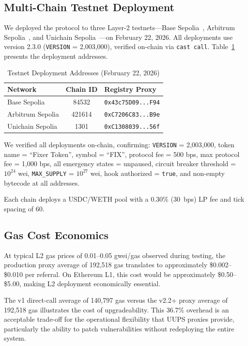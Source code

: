 \documentclass[conference]{IEEEtran}
\begin{document}
\subsection{Multi-Chain Testnet Deployment}

We deployed the protocol to three Layer-2 testnets---Base Sepolia~\cite{base}, Arbitrum Sepolia~\cite{arbitrum}, and Unichain Sepolia~\cite{unichain}---on February 22, 2026. All deployments use version 2.3.0 (\texttt{VERSION} = 2,003,000), verified on-chain via \texttt{cast call}. Table~\ref{tab:deployments} presents the deployment addresses.

\begin{table}[t]
\caption{Testnet Deployment Addresses (February 22, 2026)}
\label{tab:deployments}
\centering
\footnotesize
\begin{tabular}{lcp{3.5cm}}
\toprule
\textbf{Network} & \textbf{Chain ID} & \textbf{Registry Proxy} \\
\midrule
Base Sepolia & 84532 & \texttt{0x43c75D09...F94} \\
Arbitrum Sepolia & 421614 & \texttt{0xC7206C83...B9e} \\
Unichain Sepolia & 1301 & \texttt{0xC1308039...56f} \\
\bottomrule
\end{tabular}
\end{table}

We verified all deployments on-chain, confirming: \texttt{VERSION} = 2,003,000, token name = ``Fixer Token'', symbol = ``FIX'', protocol fee = 500 bps, max protocol fee = 1,000 bps, all emergency states = unpaused, circuit breaker threshold = $10^{24}$ wei, \texttt{MAX\_SUPPLY} = $10^{27}$ wei, hook authorized = \texttt{true}, and non-empty bytecode at all addresses.

Each chain deploys a USDC/WETH pool with a 0.30\% (30~bps) LP fee and tick spacing of 60.

\subsection{Gas Cost Economics}

At typical L2 gas prices of 0.01--0.05 gwei/gas observed during testing, the production proxy average of 192,518 gas translates to approximately \$0.002--\$0.010 per referral. On Ethereum L1, this cost would be approximately \$0.50--\$5.00, making L2 deployment economically essential.

The v1 direct-call average of 140,797 gas versus the v2.2+ proxy average of 192,518 gas illustrates the cost of upgradeability. This 36.7\% overhead is an acceptable trade-off for the operational flexibility that UUPS proxies provide, particularly the ability to patch vulnerabilities without redeploying the entire system.
\end{document}
